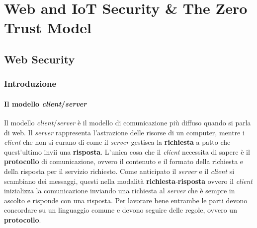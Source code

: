 \chapter{Web and IoT Security \& The Zero Trust Model}
\thispagestyle{chapterInit}
\section{Web Security}
    \subsection{Introduzione}
        \subsubsection{Il modello \textit{client}/\textit{server}}
            Il modello \textit{client}/\textit{server} è il modello di comunicazione più diffuso quando si parla di web. Il \textit{server} rappresenta l'astrazione delle risorse di un computer, mentre i \textit{client} che non si curano di come il \textit{server} gestisca la \textbf{richiesta} a patto che quest'ultimo invii una \textbf{risposta}. L'unica cosa che il \textit{client} necessita di sapere è il \textbf{protocollo} di comunicazione, ovvero il contenuto e il formato della richiesta e della risposta per il servizio richiesto.\newline
            Come anticipato il \textit{server} e il \textit{client} si scambiano dei messaggi, questi nella modalità \textbf{richiesta}-\textbf{risposta} ovvero il \textit{client} inizializza la comunicazione inviando una richiesta al \textit{server} che è sempre in ascolto e risponde con una risposta. Per lavorare bene entrambe le parti devono concordare su un linguaggio comune e devono seguire delle regole, ovvero un \textbf{protocollo}.
